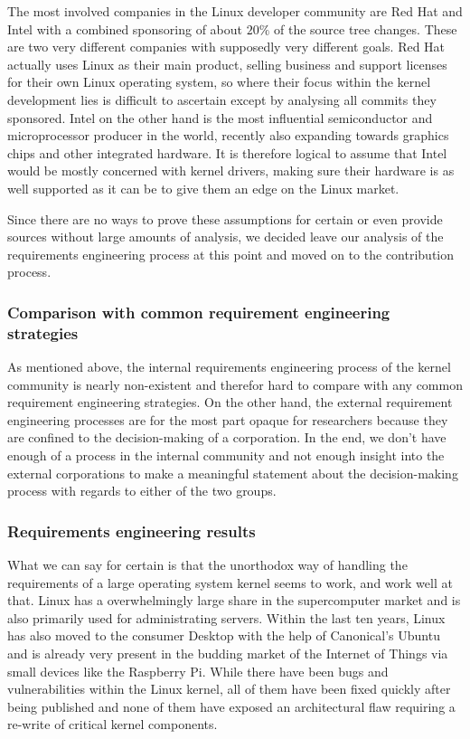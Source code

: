\documentclass{sig-alternate-05-2015}
\begin{document}
The most involved companies in the Linux developer community are Red Hat and Intel with a combined sponsoring of about \(20\%\) of the source tree changes.
These are two very different companies with supposedly very different goals.
Red Hat actually uses Linux as their main product, selling business and support licenses for their own Linux operating system, so where their focus within the kernel development lies is difficult to ascertain except by analysing all commits they sponsored.
Intel on the other hand is the most influential semiconductor and microprocessor producer in the world, recently also expanding towards graphics chips and other integrated hardware.
It is therefore logical to assume that Intel would be mostly concerned with kernel drivers, making sure their hardware is as well supported as it can be to give them an edge on the Linux market.

Since there are no ways to prove these assumptions for certain or even provide sources without large amounts of analysis, we decided leave our analysis of the requirements engineering process at this point and moved on to the contribution process.

\subsubsection{Comparison with common requirement engineering strategies}

As mentioned above, the internal requirements engineering process of the kernel community is nearly non-existent and therefor hard to compare with any common requirement engineering strategies.
On the other hand, the external requirement engineering processes are for the most part opaque for researchers because they are confined to the decision-making of a corporation.
In the end, we don't have enough of a process in the internal community and not enough insight into the external corporations to make a meaningful statement about the decision-making process with regards to either of the two groups.

\subsubsection{Requirements engineering results}

What we can say for certain is that the unorthodox way of handling the requirements of a large operating system kernel seems to work, and work well at that.
Linux has a overwhelmingly large share in the supercomputer market and is also primarily used for administrating servers.
Within the last ten years, Linux has also moved to the consumer Desktop with the help of Canonical's Ubuntu and is already very present in the budding market of the Internet of Things via small devices like the Raspberry Pi.
While there have been bugs and vulnerabilities within the Linux kernel, all of them have been fixed quickly after being published and none of them have exposed an architectural flaw requiring a re-write of critical kernel components.
\end{document}
